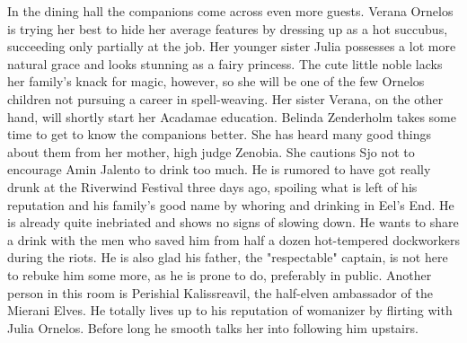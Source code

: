 In the dining hall the companions come across even more guests. Verana Ornelos is trying her best to hide her average features by dressing up as a hot succubus, succeeding only partially at the job. Her younger sister Julia possesses a lot more natural grace and looks stunning as a fairy princess. The cute little noble lacks her family's knack for magic, however, so she will be one of the few Ornelos children not pursuing a career in spell-weaving. Her sister Verana, on the other hand, will shortly start her Acadamae education. Belinda Zenderholm takes some time to get to know the companions better. She has heard many good things about them from her mother, high judge Zenobia. She cautions Sjo not to encourage Amin Jalento to drink too much. He is rumored to have got really drunk at the Riverwind Festival three days ago, spoiling what is left of his reputation and his family's good name by whoring and drinking in Eel's End. He is already quite inebriated and shows no signs of slowing down. He wants to share a drink with the men who saved him from half a dozen hot-tempered dockworkers during the riots. He is also glad his father, the "respectable" captain, is not here to rebuke him some more, as he is prone to do, preferably in public. Another person in this room is Perishial Kalissreavil, the half-elven ambassador of the Mierani Elves. He totally lives up to his reputation of womanizer by flirting with Julia Ornelos. Before long he smooth talks her into following him upstairs.\\

